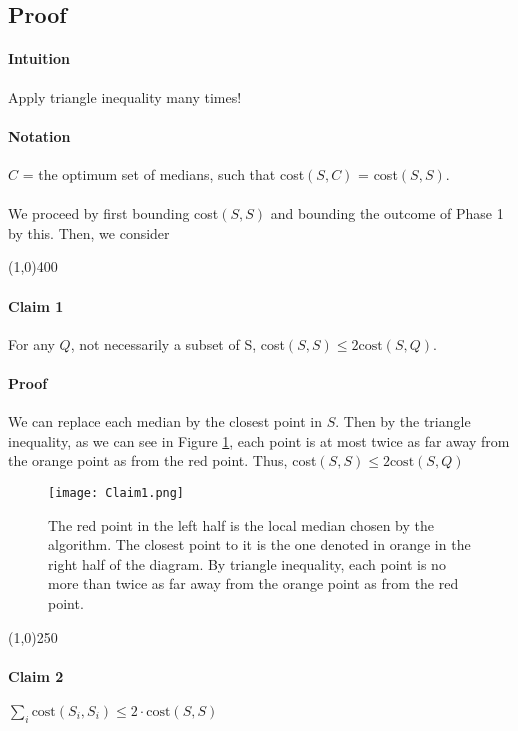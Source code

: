 \documentclass[11pt]{article}
\begin{document}
\subsection{Proof}
\paragraph{Intuition} Apply triangle inequality many times!
\paragraph{Notation}
$C$ = the optimum set of medians, such that cost$(S,C)$ = cost$(S,S)$.
\\
\\
We proceed by first bounding cost$(S,S)$ and bounding the outcome of Phase 1 by this. Then, we consider %
\begin{center}
\line(1,0){400}
\end{center}
\paragraph{Claim 1} For any $Q$, not necessarily a subset of S, cost$(S,S) \le 2 \text{cost}(S,Q)$.
\paragraph{Proof} We can replace each median by the closest point in $S$. Then by the triangle inequality, as we can see in Figure \ref{fig:redorange}, each point is at most twice as far away from the orange point as from the red point. Thus, cost$(S,S) \le 2\text{cost}(S,Q)$
\begin{figure}
\texttt{[image: Claim1.png]}
\label{fig:redorange}
\caption{The red point in the left half is the local median chosen by the algorithm. The closest point to it is the one denoted in orange in the right half of the diagram. By triangle inequality, each point is no more than twice as far away from the orange point as from the red point.}
\end{figure}
\begin{center}
\line(1,0){250}
\end{center}
\paragraph{Claim 2} $\sum_i \text{cost}(S_i,S_i) \le 2 \cdot \text{cost}(S,S)$
\end{document}
